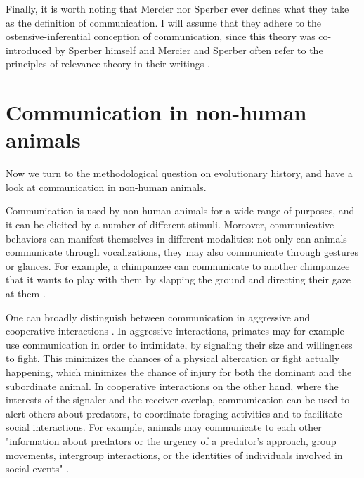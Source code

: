 Finally, it is worth noting that Mercier nor Sperber ever defines what they take as the definition of communication. I will assume that they adhere to the ostensive-inferential conception of communication, since this theory was co-introduced by Sperber himself \citep{SperberWilson86} and Mercier and Sperber often refer to the principles of relevance theory in their writings \citep{MS09, MS11, Sperber10}.


\section{Communication in non-human animals}
\label{sec:comm:phylogeny}

Now we turn to the methodological question on evolutionary history, and have a look at communication in non-human animals.

Communication is used by non-human animals for a wide range of purposes, and it can be elicited by a number of different stimuli. Moreover, communicative behaviors can manifest themselves in different modalities: not only can animals communicate through vocalizations, they may also communicate through gestures or glances. For example, a chimpanzee can communicate to another chimpanzee that it wants to play with them by slapping the ground and directing their gaze at them \citep{Call07}.

One can broadly distinguish between communication in aggressive and cooperative interactions \citep{SeyfarthCheney03}. In aggressive interactions, primates may for example use communication in order to intimidate, by signaling their size and willingness to fight. This minimizes the chances of a physical altercation or fight actually happening, which minimizes the chance of injury for both the dominant and the subordinate animal.
In cooperative interactions on the other hand, where the interests of the signaler and the receiver overlap, communication can be used to alert others about predators, to coordinate foraging activities and to facilitate social interactions. For example, animals may communicate to each other "information about predators or the urgency of a predator’s approach, group movements, intergroup interactions, or the identities of individuals involved in social events" \citep[p.~168]{SeyfarthCheney03}.

